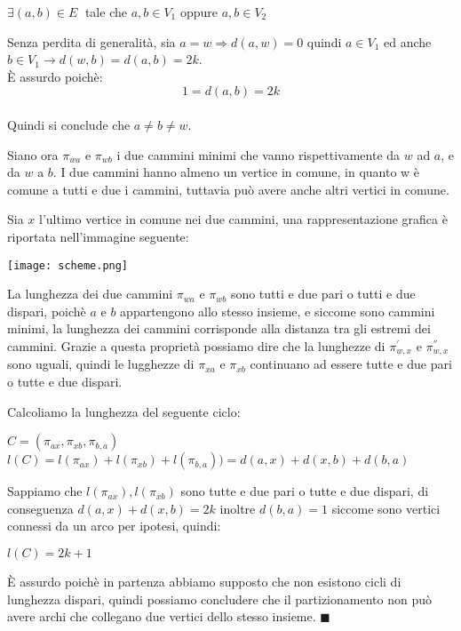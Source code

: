 \documentclass{article}
\begin{document}
\begin{center}
  $\exists (a,b) \in E \;$ tale che $a,b \in V_{1} $ oppure $ a,b \in V_{2}$ 
\end{center}

Senza perdita di generalità, sia $a=w \Rightarrow d(a,w) = 0$ quindi $a \in V_{1} $ 
ed anche $b \in V_{1} \rightarrow d(w,b) = d(a,b) = 2k$. \\
È assurdo poichè: 
\[1=d(a,b)= 2k\] \\
Quindi si conclude che $a \neq b \neq w$.

Siano ora $\pi_{wa}$ e $\pi_{wb}$ i due cammini minimi che vanno rispettivamente da $w $ ad $ a $, 
e da $w$ a $b$.  
I due cammini hanno almeno un vertice in comune, in quanto w è comune a tutti e due i cammini, 
tuttavia può avere anche altri vertici in comune.

Sia $x$ l'ultimo vertice in comune nei due cammini, una rappresentazione grafica è riportata 
nell'immagine seguente: 
  
\begin{center}
\texttt{[image: scheme.png]}
\end{center}

La lunghezza dei due cammini $\pi_{wa}$ e $\pi_{wb}$ sono tutti e due pari o tutti e due dispari,
poichè $a$ e $b$ appartengono allo stesso insieme, e siccome sono cammini minimi, la lunghezza dei
cammini corrisponde alla distanza tra gli estremi dei cammini. Grazie a questa proprietà possiamo
dire che la lunghezze di $\pi_{w,x}^{'}$ e $\pi_{w,x}^{''}$ sono uguali, quindi le 
lugghezze di  $\pi_{xa}$ e $\pi_{xb}$ continuano ad essere tutte e due pari o tutte e due dispari. 

Calcoliamo la lunghezza del seguente ciclo:

\begin{center}
  $C=(\pi_{ax},\pi_{xb},\pi_{b,a})$ \\
  $l(C)= l(\pi_{ax})+l(\pi_{xb})+l(\pi_{b,a})) = d(a,x)+d(x,b)+d(b,a)$
\end{center}
Sappiamo che $l(\pi_{ax}), l(\pi_{xb})$ sono tutte e due pari o tutte e due dispari, di conseguenza
 $d(a,x)+d(x,b)=2k$ inoltre $d(b,a) = 1$ siccome sono vertici connessi da un arco per ipotesi, quindi:

 \begin{center}
  $l(C)=2k+1$ 
 \end{center}
 
È assurdo poichè in partenza abbiamo supposto che non esistono cicli di lunghezza
dispari, quindi possiamo concludere che il partizionamento non può avere archi
che collegano due vertici dello stesso insieme.
 $\blacksquare$
\\
\end{document}
